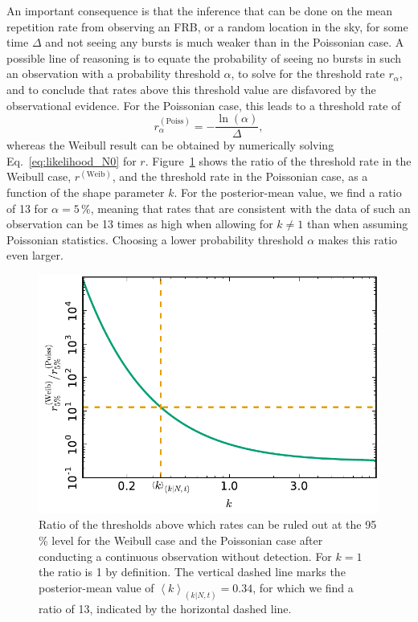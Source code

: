 \documentclass[fleqn,usenatbib]{mnras}
\newcommand{\new}[1]{#1}
\begin{document}
\new{An important consequence is that the inference that can be done on the mean repetition rate from observing an FRB, or a random location in the sky, for some time $\Delta$ and not seeing any bursts is much weaker than in the Poissonian case. A possible line of reasoning is to equate the probability of seeing no bursts in such an observation with a probability threshold $\alpha$, to solve for the threshold rate $r_\alpha$, and to conclude that rates above this threshold value are disfavored by the observational evidence. For the Poissonian case, this leads to a threshold rate of
\begin{equation}
	r^{\mathrm{(Poiss)}}_\alpha = - \frac{\ln(\alpha)}{\Delta},
\end{equation}
whereas the Weibull result can be obtained by numerically solving Eq.~\eqref{eq:likelihood_N0} for $r$. Figure~\ref{fig:ruleout} shows the ratio of the threshold rate in the Weibull case, $r^{\mathrm{(Weib)}}$, and the threshold rate in the Poissonian case, as a function of the shape parameter $k$. For the posterior-mean value, we find a ratio of 13 for $\alpha = 5\,\%$, meaning that rates that are consistent with the data of such an observation can be 13 times as high when allowing for $k \neq 1$ than when assuming Poissonian statistics. Choosing a lower probability threshold $\alpha$ makes this ratio even larger.}

\begin{figure}
	\includegraphics[width=1.0\columnwidth]{rule_out_rate.pdf}
	\caption{\label{fig:ruleout}\new{Ratio of the thresholds above which rates can be ruled out at the 95\,\% level for the Weibull case and the Poissonian case after conducting a continuous observation without detection. For $k = 1$ the ratio is 1 by definition. The vertical dashed line marks the posterior-mean value of $\left<k\right>_{(k|N,t)}=0.34$, for which we find a ratio of 13, indicated by the horizontal dashed line.}}
\end{figure}
\end{document}
